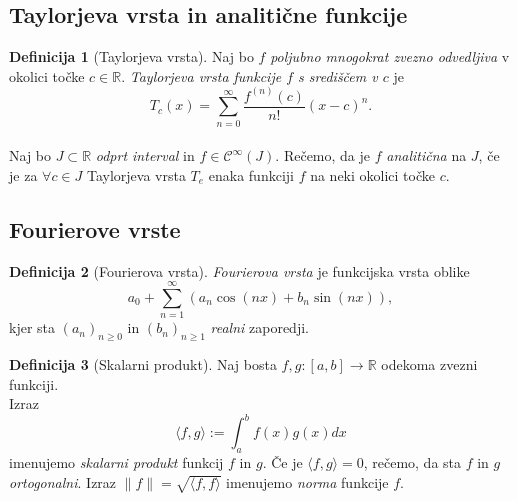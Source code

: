\documentclass[11pt]{article}
\theoremstyle{definition}
\newtheorem{definicija}{Definicija}[section]
\theoremstyle{definition}
\theoremstyle{definition}
\theoremstyle{theorem}
\begin{document}

\subsection{Taylorjeva vrsta in analitične funkcije}
\vspace{0.5cm}

\begin{definicija}[Taylorjeva vrsta]

Naj bo $f$ \textit{poljubno mnogokrat zvezno odvedljiva} v okolici točke $c \in \mathbb{R}$. \textit{Taylorjeva vrsta funkcije $f$ s središčem v $c$} je 
$$T_c(x) = \sum_{n=0}^{\infty} \frac{f^{(n)}(c)}{n!} (x-c)^n.$$ \\

Naj bo $J \subset \mathbb{R}$ \textit{odprt interval} in $f \in \mathcal{C}^{\infty}(J)$. Rečemo, da je $f$ \textit{analitična} na $J$, če je za $\forall c \in J$ Taylorjeva vrsta $T_e$ enaka funkciji $f$ na neki okolici točke $c$.

\end{definicija}
\vspace{0.5cm}


\subsection{Fourierove vrste}
\vspace{0.5cm}

\begin{definicija}[Fourierova vrsta]

\textit{Fourierova vrsta} je funkcijska vrsta oblike
$$a_0 + \sum_{n=1}^{\infty} (a_n \cos(nx) + b_n \sin(nx)),$$
kjer sta $(a_n)_{n \geq 0}$ in $(b_n)_{n \geq 1}$ \textit{realni} zaporedji.

\end{definicija}
\vspace{0.5cm}

\begin{definicija}[Skalarni produkt]

Naj bosta $f, g: [a, b] \rightarrow \mathbb{R}$ odekoma zvezni funkciji. \\ Izraz
$$\langle f, g \rangle := \int_{a}^{b} f(x) g(x) dx$$
imenujemo \textit{skalarni produkt} funkcij $f$ in $g$. Če je $\langle f, g \rangle = 0$, rečemo, da sta $f$ in $g$ \textit{ortogonalni}. Izraz $\| f \| = \sqrt{\langle f, f \rangle}$ imenujemo \textit{norma} funkcije $f$.

\end{definicija}
\vspace{0.5cm}
\end{document}
